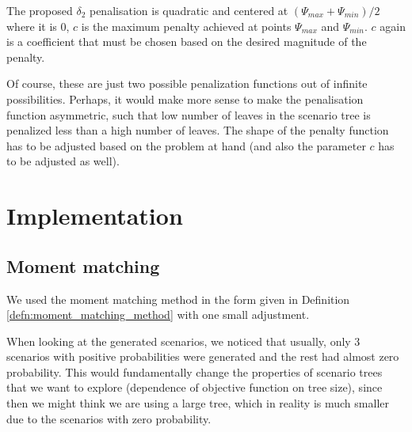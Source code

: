 The proposed $\delta_2$ penalisation is quadratic and centered at $(\Psi_{max}+\Psi_{min})/2$ where it is 0, $c$ is the maximum penalty achieved at points $\Psi_{max}$ and $\Psi_{min}$. $c$ again is a coefficient that must be chosen based on the desired magnitude of the penalty.

Of course, these are just two possible penalization functions out of infinite possibilities. Perhaps, it would make more sense to make the penalisation function asymmetric, such that low number of leaves in the scenario tree is penalized less than a high number of leaves. The shape of the penalty function has to be adjusted based on the problem at hand (and also the parameter $c$ has to be adjusted as well).

\section{Implementation}
\subsection{Moment matching}
We used the moment matching method in the form given in Definition \ref{defn:moment_matching_method} with one small adjustment. 

When looking at the generated scenarios, we noticed that usually, only 3 scenarios with positive probabilities were generated and the rest had almost zero probability. This would fundamentally change the properties of scenario trees that we want to explore (dependence of objective function on tree size), since then we might think we are using a large tree, which in reality is much smaller due to the scenarios with zero probability. 

